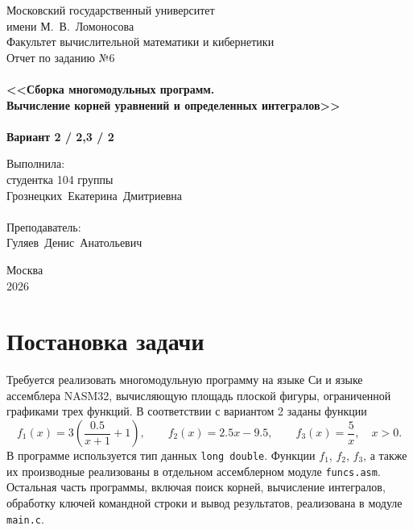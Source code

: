 \documentclass[a4paper,12pt,titlepage,finall]{article}
\begin{document}
\begin{titlepage}
    \begin{center}
    {\small \sc Московский государственный университет \\имени М.~В.~Ломоносова\\
    Факультет вычислительной математики и кибернетики\\}
    \vfill
    {\Large \sc Отчет по заданию №6}\\
    ~\\
    {\large \bf <<Сборка многомодульных программ. \\
    Вычисление корней уравнений и определенных интегралов>>}\\
    ~\\
    {\large \bf Вариант 2 / 2,3 / 2}
    \end{center}
    \begin{flushright}
    \vfill {Выполнила:\\
    студентка 104 группы\\
    Грознецких~Екатерина~Дмитриевна\\
    ~\\
    Преподаватель:\\
    Гуляев~Денис~Анатольевич\\
    }
    \end{flushright}
    \begin{center}
    \vfill
    {\small Москва\\2026}
    \end{center}
\end{titlepage}

\tableofcontents

\newpage
\section{Постановка задачи}

Требуется реализовать многомодульную программу на языке Си и языке ассемблера NASM32, вычисляющую площадь плоской фигуры, ограниченной графиками трех функций. В соответствии с вариантом 2 заданы функции
\[
    f_1(x)=3\left(\frac{0.5}{x+1}+1\right),\qquad
    f_2(x)=2.5x-9.5,\qquad
    f_3(x)=\frac{5}{x},\quad x>0.
\]
В программе используется тип данных \texttt{long double}. Функции \(f_1\), \(f_2\), \(f_3\), а также их производные реализованы в отдельном ассемблерном модуле \texttt{funcs.asm}. Остальная часть программы, включая поиск корней, вычисление интегралов, обработку ключей командной строки и вывод результатов, реализована в модуле \texttt{main.c}.
\end{document}
